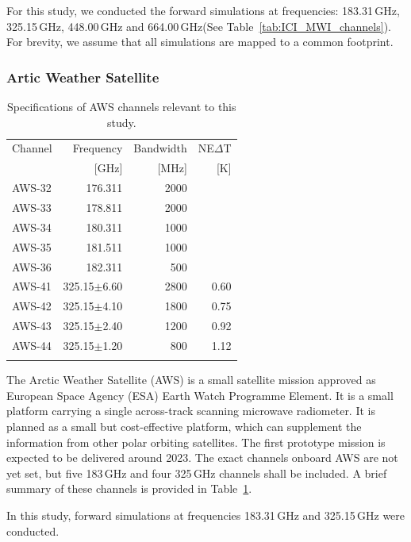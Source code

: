 \documentclass[amt, manuscript]{copernicus}
\begin{document}
For this study, we conducted the forward simulations at frequencies: 183.31\,GHz, 325.15\,GHz, 448.00\,GHz and 664.00\,GHz(See Table~\ref{tab:ICI_MWI_channels}). For brevity, we assume that all simulations are mapped to a common footprint.

\subsubsection{Artic Weather Satellite}
%
\begin{table}[t]
	\caption{Specifications of AWS channels relevant to this study.}
	\label{tab:specifications_AWS}	
	\begin{tabular}{lrrr}
		\tophline
		Channel & Frequency 	& Bandwidth & NE$\Delta$T \\
				& [GHz]			& [MHz]		& [K]		\\
		\middlehline
		AWS-32	&	176.311    & 2000	&		\\
		AWS-33	&	178.811    & 2000 	&	\\
		AWS-34	&	180.311    & 1000 	&	\\
		AWS-35	&	181.511    & 1000 	&	 \\
		AWS-36	&	182.311    & \phantom{0}500  &	 \\
		AWS-41  & 325.15$\pm$6.60    & 2800 	 &0.60\\
		AWS-42  & 325.15$\pm$4.10    & 1800    &0.75	\\
		AWS-43  & 325.15$\pm$2.40    & 1200    &0.92\\
		AWS-44  & 325.15$\pm$1.20    & \phantom{0}800  &1.12  \\
		\bottomhline
	\end{tabular}
	\belowtable{} %
\end{table}
The Arctic Weather Satellite (AWS) is a small satellite mission approved as European Space Agency (ESA)
Earth Watch Programme Element. It is a small platform carrying a single across-track scanning microwave radiometer. It is planned as a small but cost-effective platform, which can supplement the information from other polar orbiting satellites. The first prototype mission is expected to be delivered around 2023. The exact channels onboard AWS are not yet set, but five 183\,GHz and four 325\,GHz channels shall be included. A brief summary of these channels is provided in Table~\ref{tab:specifications_AWS}.
 
In this study, forward simulations at frequencies 183.31\,GHz and 325.15\,GHz were conducted. 
\end{document}
